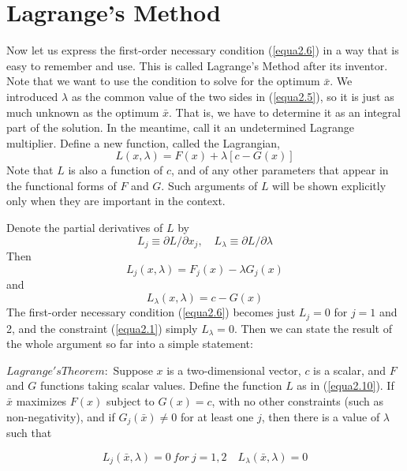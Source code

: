 \section*{Lagrange's Method}

Now let us express the first-order necessary condition (\ref{equa2.6}) in a way that is easy to remember and use. This is called Lagrange's Method after its inventor. Note that we want to use the condition to solve for the optimum $\bar{x}$. We introduced $\lambda$ as the common value of the two sides in (\ref{equa2.5}), so it is just as much unknown as the optimum $\bar{x}$. That is, we have to determine it as an integral part of the solution. In the meantime, call it an undetermined Lagrange multiplier. Define a new function, called the Lagrangian,
\begin{equation} \label{equa2.10}
L(x, \lambda) = F(x) + \lambda[c - G(x) ]
\end{equation}
Note that $L$ is also a function of $c$, and of any other parameters that appear in the functional forms of $F$ and $G$. Such arguments of $L$ will be shown explicitly only when they are important in the context.

Denote the partial derivatives of $L$ by 
\begin{equation*}
L_j \equiv \partial L/ \partial x_j, \quad L_\lambda \equiv \partial L / \partial \lambda
\end{equation*}
Then
\begin{equation*}
L_j(x, \lambda) = F_j(x) - \lambda G_j(x)
\end{equation*}
and
\begin{equation*}
L_\lambda(x, \lambda) = c- G(x)
\end{equation*}
The first-order necessary condition (\ref{equa2.6}) becomes just $L_j =0$ for $j=1$ and 2, and the constraint (\ref{equa2.1}) simply $L_\lambda =0$. Then we can state the result of the whole argument so far into a simple statement:

$Lagrange's Theorem:$ Suppose $x$ is a two-dimensional vector, $c$ is a scalar, and $F$ and $G$ functions taking scalar values. Define the function $L$ as in (\ref{equa2.10}). If $\bar{x}$ maximizes $F(x)$ subject to $G(x)=c$, with no other constraints (such as non-negativity), and if $G_j(\bar{x}) \neq 0$ for at least one $j$, then there is a value of $\lambda$ such that

\begin{equation} \label{equa2.11}
L_j(\bar{x}, \lambda) = 0  \  for  \ j=1,2  \quad L_\lambda(\bar{x}, \lambda) = 0
\end{equation}

